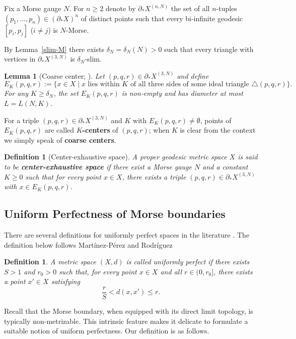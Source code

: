 \documentclass[a4paper,11pt,oneside]{article}
\newtheorem{Definition}[Theorem]{Definition}
\newtheorem{Lemma}[Theorem]{Lemma}
\begin{document}
Fix a Morse gauge $N$. For $n\ge 2$ denote by $\partial_*X^{(n,N)}$ the set of all $n$-tuples $(p_1,\dots,p_n)\in(\partial_*X)^n$ of distinct points such that every bi-infinite geodesic $[p_i,p_j]$ ($i\neq j$) is $N$-Morse. 

By Lemma~\ref{slim-M} there exists $\delta_N=\delta_N(N)>0$ such that every triangle with vertices in $\partial_*X^{(3,N)}$ is $\delta_N$-slim.

\begin{Lemma}[Coarse center; \cite{CharneyCordesMurray19}]\label{Lemma:Center}
Let $(p,q,r)\in\partial_*X^{(3,N)}$ and define
\[
E_K(p,q,r):=\bigl\{x\in X\mid x\text{ lies within }K\text{ of all three sides of some ideal triangle } \triangle(p,q,r)\bigr\}.
\]
For any $K\ge\delta_N$, the set $E_K(p,q,r)$ is non‑empty and has diameter at most $L=L(N, K)$.
\end{Lemma}

For a triple $(p,q,r)\in\partial_*X^{(3,N)}$ and $K$ with $E_K(p,q,r)\neq\emptyset$, points of $E_K(p,q,r)$ are called \textbf{$K$-centers} of $(p,q,r)$; when $K$ is clear from the context we simply speak of \textbf{coarse centers}.

\begin{Definition}[Center-exhaustive space]\label{def:center-exh}
A proper geodesic metric space $X$ is said to be \textbf{center-exhaustive space} if there exist a Morse gauge $N$ and a constant $K\ge0$ such that for every point $x \in X$, there exists a triple $(p, q, r) \in \partial_*X^{(3, N)}$ with $x \in E_K(p, q, r)$.
\end{Definition}

\subsection{Uniform Perfectness of Morse boundaries}

There are several definitions for uniformly perfect spaces in the literature \cite{MAR18, Nowak12, Sugawa01}. The definition below follows Mart\'inez-P\'erez and Rodr\'iguez \cite{MAR18}

\begin{Definition}
    A metric space $(X, d)$ is called uniformly perfect if there exists $S> 1$ and $r_0>0$ such that, for every point $x\in X$ and all $r\in(0, r_0]$, there exists a point $x'\in X$ satisfying \[
    \frac{r}{S} < d(x, x') \le r.
    \]
\end{Definition}

Recall that the Morse boundary, when equipped with its direct limit topology, is typically non-metrizable. This intrinsic feature makes it delicate to formulate a suitable notion of uniform perfectness. 
Our definition is as follows.
\end{document}

